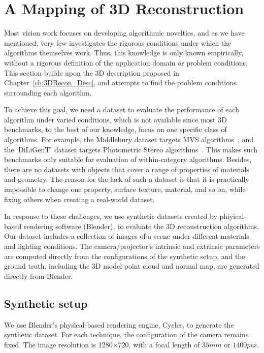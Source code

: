 
\chapter{A Mapping of 3D Reconstruction}
\label{ch:3DRecon_Mapping}
Most vision work focuses on developing algorithmic novelties, and as we have mentioned, very few investigates the rigorous conditions under which the algorithms themselves work. Thus, this knowledge is only known empirically, without a rigorous definition of the application domain or problem conditions. This section builds upon the 3D description proposed in Chapter~\ref{ch:3DRecon_Desc}, and attempts to find the problem conditions surrounding each algorithm.

To achieve this goal, we need a dataset to evaluate the performance of each algorithm under varied conditions, which is not available since most 3D benchmarks, to the best of our knowledge, focus on one specific class of algorithms. For example, the Middlebury dataset targets MVS algorithms~\cite{seitz2006comparison}, and the `DiLiGenT' dataset targets Photometric Stereo algorithms~\cite{shi2016benchmark}. This makes such benchmarks only suitable for evaluation of within-category algorithms. Besides, there are no datasets with objects that cover a range of properties of materials and geometry. The reason for the lack of such a dataset is that it is practically impossible to change one property, \eg surface texture, material, and so on, while fixing others when creating a real-world dataset.

In response to these challenges, we use synthetic datasets created by phiyical-based rendering software (Blender), to evaluate the 3D reconstruction algorithms. Our dataset includes a collection of images of a scene under different materials and lighting conditions. The camera/projector's intrinsic and extrinsic parameters are computed directly from the configurations of the synthetic setup, and the ground truth, including the 3D model point cloud and normal map, are generated directly from Blender.

\section{Synthetic setup}
We use Blender's physical-based rendering engine, Cycles, to generate the synthetic dataset. For each technique, the configuration of the camera remains fixed. The image resolution is 1280$\times$720, with a focal length of $35mm$ or $1400pix$.

